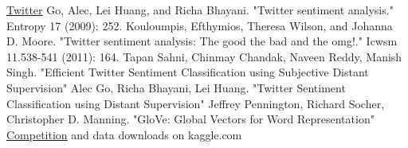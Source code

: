\documentclass[10pt,conference,compsocconf]{IEEEtran}
\begin{document}
\begin{thebibliography}{99}
	 \href{http://twitter.com}{Twitter}
	 Go, Alec, Lei Huang, and Richa Bhayani. "Twitter sentiment analysis." Entropy 17 (2009): 252.
	 Kouloumpis, Efthymios, Theresa Wilson, and Johanna D. Moore. "Twitter sentiment analysis: The good the bad and the omg!." Icwsm 11.538-541 (2011): 164.
	 Tapan Sahni, Chinmay Chandak, Naveen Reddy, Manish Singh. "Efficient Twitter Sentiment Classification using Subjective Distant Supervision"
	 Alec Go, Richa Bhayani,	Lei Huang. "Twitter Sentiment Classification using Distant Supervision"
	 Jeffrey Pennington, Richard Socher, Christopher D. Manning. "GloVe: Global Vectors for Word Representation"
	 \href{https://www.kaggle.com/c/epfml17-text/data}{Competition} and data downloads on kaggle.com
\end{thebibliography}
\end{document}
